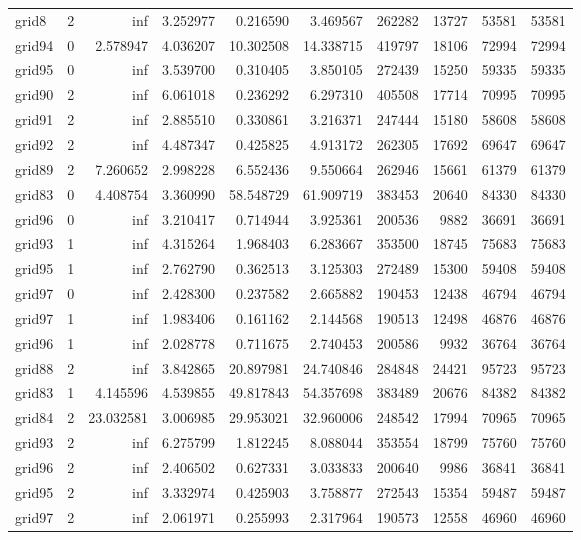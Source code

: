\begin{longtable}{|l|r|r|r|r|r|r|r|r|r|}
grid8 & 2 & inf & 3.252977 & 0.216590 & 3.469567 & 262282 & 13727 & 53581 & 53581 \\
grid94 & 0 & 2.578947 & 4.036207 & 10.302508 & 14.338715 & 419797 & 18106 & 72994 & 72994 \\
grid95 & 0 & inf & 3.539700 & 0.310405 & 3.850105 & 272439 & 15250 & 59335 & 59335 \\
grid90 & 2 & inf & 6.061018 & 0.236292 & 6.297310 & 405508 & 17714 & 70995 & 70995 \\
grid91 & 2 & inf & 2.885510 & 0.330861 & 3.216371 & 247444 & 15180 & 58608 & 58608 \\
grid92 & 2 & inf & 4.487347 & 0.425825 & 4.913172 & 262305 & 17692 & 69647 & 69647 \\
grid89 & 2 & 7.260652 & 2.998228 & 6.552436 & 9.550664 & 262946 & 15661 & 61379 & 61379 \\
grid83 & 0 & 4.408754 & 3.360990 & 58.548729 & 61.909719 & 383453 & 20640 & 84330 & 84330 \\
grid96 & 0 & inf & 3.210417 & 0.714944 & 3.925361 & 200536 & 9882 & 36691 & 36691 \\
grid93 & 1 & inf & 4.315264 & 1.968403 & 6.283667 & 353500 & 18745 & 75683 & 75683 \\
grid95 & 1 & inf & 2.762790 & 0.362513 & 3.125303 & 272489 & 15300 & 59408 & 59408 \\
grid97 & 0 & inf & 2.428300 & 0.237582 & 2.665882 & 190453 & 12438 & 46794 & 46794 \\
grid97 & 1 & inf & 1.983406 & 0.161162 & 2.144568 & 190513 & 12498 & 46876 & 46876 \\
grid96 & 1 & inf & 2.028778 & 0.711675 & 2.740453 & 200586 & 9932 & 36764 & 36764 \\
grid88 & 2 & inf & 3.842865 & 20.897981 & 24.740846 & 284848 & 24421 & 95723 & 95723 \\
grid83 & 1 & 4.145596 & 4.539855 & 49.817843 & 54.357698 & 383489 & 20676 & 84382 & 84382 \\
grid84 & 2 & 23.032581 & 3.006985 & 29.953021 & 32.960006 & 248542 & 17994 & 70965 & 70965 \\
grid93 & 2 & inf & 6.275799 & 1.812245 & 8.088044 & 353554 & 18799 & 75760 & 75760 \\
grid96 & 2 & inf & 2.406502 & 0.627331 & 3.033833 & 200640 & 9986 & 36841 & 36841 \\
grid95 & 2 & inf & 3.332974 & 0.425903 & 3.758877 & 272543 & 15354 & 59487 & 59487 \\
grid97 & 2 & inf & 2.061971 & 0.255993 & 2.317964 & 190573 & 12558 & 46960 & 46960 \\

\end{longtable}
